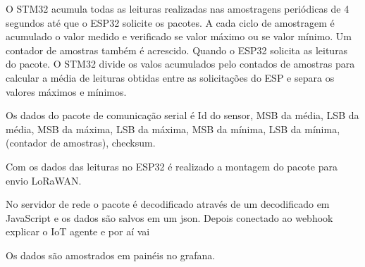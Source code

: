 O STM32 acumula todas as leituras realizadas nas amostragens periódicas de 4 segundos até que o ESP32 solicite os pacotes. A cada ciclo de amostragem é acumulado o valor medido e verificado se valor máximo ou se valor mínimo. Um contador de amostras também é acrescido. Quando o ESP32 solicita as leituras do pacote. O STM32 divide os valos acumulados pelo contados de amostras para calcular a média de leituras obtidas entre as solicitações do ESP e separa os valores máximos e mínimos.

Os dados do pacote de comunicação serial é Id do sensor, MSB da média, LSB da média, MSB da máxima, LSB da máxima, MSB da mínima, LSB da mínima, (contador de amostras), checksum.

Com os dados das leituras no ESP32 é realizado a montagem do pacote para envio LoRaWAN.


No servidor de rede o pacote é decodificado através de um decodificado em JavaScript e os dados são salvos em um json. Depois conectado ao webhook explicar o IoT agente e por aí vai


Os dados são amostrados em painéis no grafana.
